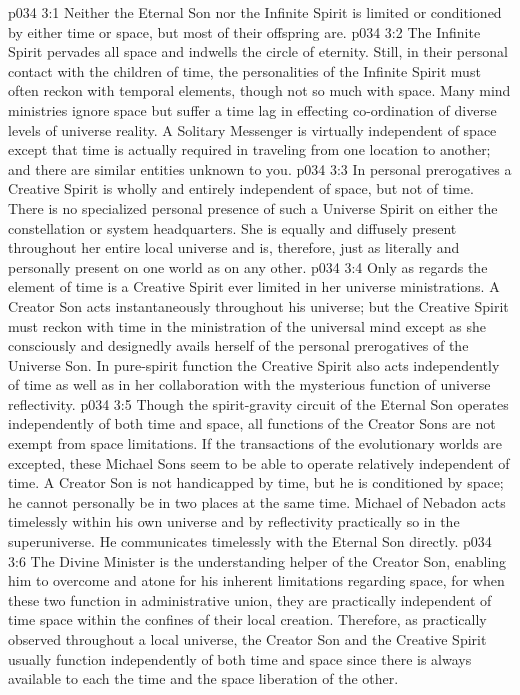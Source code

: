 \vs p034 3:1 Neither the Eternal Son nor the Infinite Spirit is limited or conditioned by either time or space, but most of their offspring are.
\vs p034 3:2 The Infinite Spirit pervades all space and indwells the circle of eternity. Still, in their personal contact with the children of time, the personalities of the Infinite Spirit must often reckon with temporal elements, though not so much with space. Many mind ministries ignore space but suffer a time lag in effecting co\hyp{}ordination of diverse levels of universe reality. A Solitary Messenger is virtually independent of space except that time is actually required in traveling from one location to another; and there are similar entities unknown to you.\plusone
\pc \vs p034 3:3 In personal prerogatives a Creative Spirit is wholly and entirely independent of space, but not of time. There is no specialized personal presence of such a Universe Spirit on either the constellation or system headquarters. She is equally and diffusely present throughout her entire local universe and is, therefore, just as literally and personally present on one world as on any other.
\vs p034 3:4 Only as regards the element of time is a Creative Spirit ever limited in her universe ministrations. A Creator Son acts instantaneously throughout his universe; but the Creative Spirit must reckon with time in the ministration of the universal mind except as she consciously and designedly avails herself of the personal prerogatives of the Universe Son. In pure\hyp{}spirit function the Creative Spirit also acts independently of time as well as in her collaboration with the mysterious function of universe reflectivity.
\pc \vs p034 3:5 Though the spirit\hyp{}gravity circuit of the Eternal Son operates independently of both time and space, all functions of the Creator Sons are not exempt from space limitations. If the transactions of the evolutionary worlds are excepted, these Michael Sons seem to be able to operate relatively independent of time. A Creator Son is not handicapped by time, but he is conditioned by space; he cannot personally be in two places at the same time. Michael of Nebadon acts timelessly within his own universe and by reflectivity practically so in the superuniverse. He communicates timelessly with the Eternal Son directly.
\vs p034 3:6 The Divine Minister is the understanding helper of the Creator Son, enabling him to overcome and atone for his inherent limitations regarding space, for when these two function in administrative union, they are practically independent of time  space within the confines of their local creation. Therefore, as practically observed throughout a local universe, the Creator Son and the Creative Spirit usually function independently of both time and space since there is always available to each the time and the space liberation of the other.
